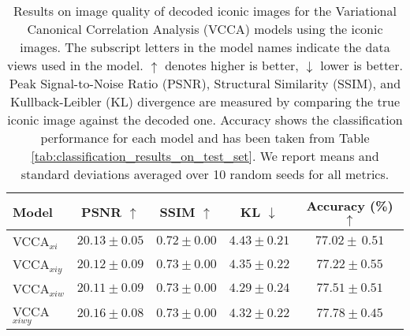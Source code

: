 
\renewcommand{\arraystretch}{1.05}
\begin{table}[!th]
\centering
\caption{Results on image quality of decoded iconic images for the Variational Canonical Correlation Analysis (VCCA) models using the iconic images. The subscript letters in the model names indicate the data views used in the model. $\uparrow$ denotes higher is better, $\downarrow$ lower is better. Peak Signal-to-Noise Ratio (PSNR), Structural Similarity (SSIM), and Kullback-Leibler (KL) divergence are measured by comparing the true iconic image against the decoded one. Accuracy shows the classification performance for each model and has been taken from Table \ref{tab:classification_results_on_test_set}. We report means and standard deviations averaged over 10 random seeds for all metrics.
}
\begin{tabular}{l c c c c }
    \hline
    Model & PSNR $\uparrow$ & SSIM $\uparrow$ & KL $\downarrow$ &  Accuracy (\%) $\uparrow$  \\ \hline
    VCCA$_{x i}$ & $20.13 \pm 0.05$ & $0.72 \pm 0.00$ & $4.43 \pm 0.21$ & $77.02 \pm \, 0.51$  \\ 
    \rowcolor{gray!30}
    VCCA$_{x i y}$ & $20.12 \pm 0.09$ & $0.73 \pm 0.00$ & $4.35 \pm 0.22$ & $77.22 \pm 0.55$  \\ 
    VCCA$_{x i w}$ & $20.11 \pm 0.09$ & $0.73 \pm 0.00$ & $4.29 \pm 0.24$ & $77.51 \pm 0.51$  \\
    \rowcolor{gray!30}
    VCCA$_{x i w y}$ & $20.16 \pm 0.08$ & $0.73 \pm	0.00$ & $4.32 \pm 0.22$ & $77.78 \pm 0.45$  \\  
    \hline
\end{tabular}
\label{tab:iconic_image_similarity_metrics}
\end{table}